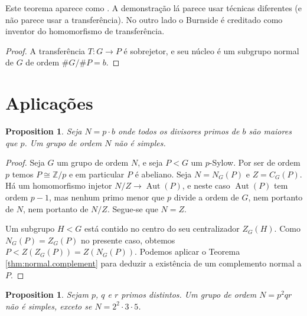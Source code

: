 \documentclass[12pt]{article}
\theoremstyle{plain}
\newtheorem{prop}[thm]{Proposition}
\theoremstyle{definition}
\newcommand{\Z}{\mathbb{Z}}
\DeclareMathOperator{\Aut}{Aut}
\begin{document}
Este teorema aparece como {\cite[\S 243, Theorem II]{Burnside1911}}. A demonstração lá parece usar técnicas diferentes (e não parece usar a transferência). No outro lado o Burnside é creditado como inventor do homomorfismo de transferência.

\begin{proof}
A transferência $T : G \rightarrow P$ é sobrejetor, e seu núcleo é um subgrupo normal de $G$ de ordem $\# G / \# P = b$.
\end{proof}



\section{Aplicações}


\begin{prop}\label{prop:smallest.prime.simple}
Seja $N = p \cdot b$ onde todos os divisores primos de $b$ são maiores que $p$. Um grupo de ordem $N$ não é simples.
\end{prop}

\begin{proof}
Seja $G$ um grupo de ordem $N$, e seja $P < G$ um $p$-Sylow. Por ser de ordem $p$ temos $P \cong \Z/p$ e em particular $P$ é abeliano. Seja $N = N_G(P)$ e $Z = C_G(P)$. Há um homomorfismo injetor $N / Z \rightarrow \Aut(P)$, e neste caso $\Aut(P)$ tem ordem $p-1$, mas nenhum primo menor que $p$ divide a ordem de $G$, nem portanto de $N$, nem portanto de $N/Z$. Segue-se que $N = Z$.

Um subgrupo $H < G$ está contido no centro do seu centralizador $Z_G(H)$. Como $N_G(P) = Z_G(P)$ no presente caso, obtemos $P < Z(Z_G(P)) = Z(N_G(P))$. Podemos aplicar o Teorema \ref{thm:normal.complement} para deduzir a existência de um complemento normal a $P$.
\end{proof}


\begin{prop}\label{prop:p2qr}
Sejam $p$, $q$ e $r$ primos distintos. Um grupo de ordem $N = p^2 q r$ não é simples, exceto se $N = 2^2 \cdot 3 \cdot 5$.
\end{prop}
\end{document}
